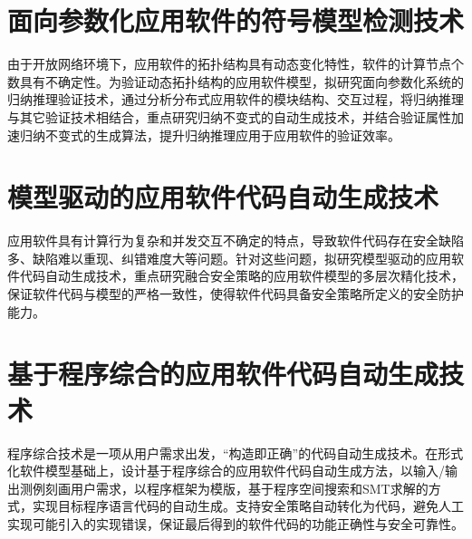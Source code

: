 \section{面向参数化应用软件的符号模型检测技术}
由于开放网络环境下，应用软件的拓扑结构具有动态变化特性，软件的计算节点个数具有不确定性。为验证动态拓扑结构的应用软件模型，拟研究面向参数化系统的归纳推理验证技术，通过分析分布式应用软件的模块结构、交互过程，将归纳推理与其它验证技术相结合，重点研究归纳不变式的自动生成技术，并结合验证属性加速归纳不变式的生成算法，提升归纳推理应用于应用软件的验证效率。
\section{模型驱动的应用软件代码自动生成技术}
应用软件具有计算行为复杂和并发交互不确定的特点，导致软件代码存在安全缺陷多、缺陷难以重现、纠错难度大等问题。针对这些问题，拟研究模型驱动的应用软件代码自动生成技术，重点研究融合安全策略的应用软件模型的多层次精化技术，保证软件代码与模型的严格一致性，使得软件代码具备安全策略所定义的安全防护能力。
\section{基于程序综合的应用软件代码自动生成技术}
程序综合技术是一项从用户需求出发，“构造即正确”的代码自动生成技术。在形式化软件模型基础上，设计基于程序综合的应用软件代码自动生成方法，以输入/输出测例刻画用户需求，以程序框架为模版，基于程序空间搜索和SMT求解的方式，实现目标程序语言代码的自动生成。支持安全策略自动转化为代码，避免人工实现可能引入的实现错误，保证最后得到的软件代码的功能正确性与安全可靠性。
